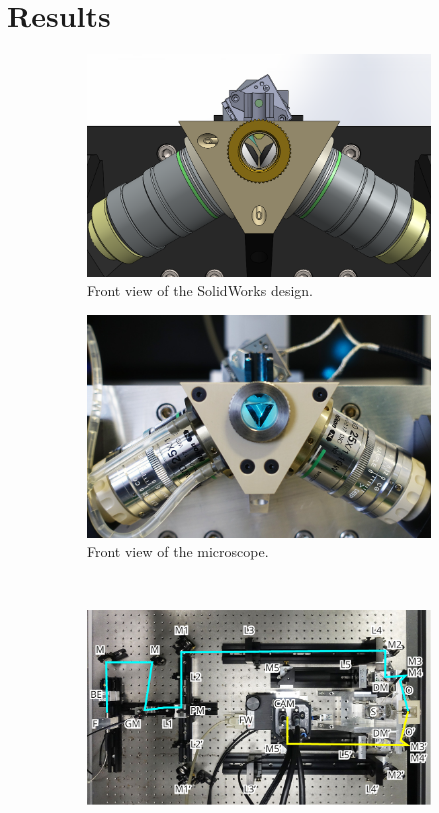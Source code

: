 \section{Results}
  \begin{figure}
    \begin{subfigure}[t]{0.5\textwidth}
      \centering
      \includegraphics[width=\textwidth]{photos/front_solidworks_overlay}
      \caption{Front view of the SolidWorks design.}
    \end{subfigure}
    \begin{subfigure}[t]{0.5\textwidth}
      \centering
      \includegraphics[width=\textwidth]{photos/front_photo_overlay.jpg}
      \caption{Front view of the microscope.}
    \end{subfigure}
    \\
    \begin{subfigure}[t]{1\textwidth}
      \centering
      \includegraphics[width=\textwidth]{photos/top+light}

\end{subfigure}
\end{figure}
